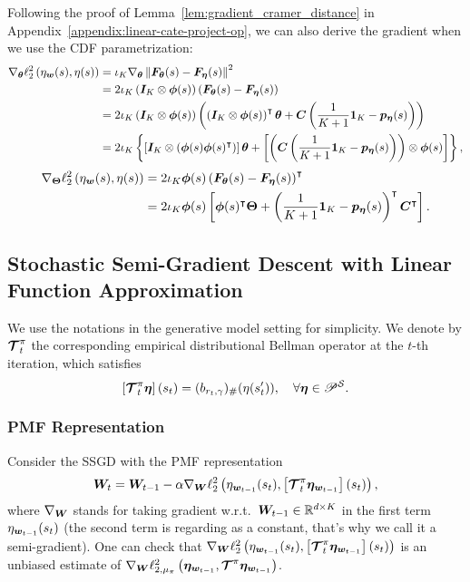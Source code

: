Following the proof of Lemma~\ref{lem:gradient_cramer_distance} in Appendix~\ref{appendix:linear-cate-project-op}, we can also derive the gradient when we use the CDF parametrization:
\begin{align*}
        \nabla_{{\bm{\theta}}} \ell_2^2\left({{\eta}_{{\bm{w}}}(s),{\eta}(s)}\right)&=\iota_K\nabla_{{\bm{\theta}}}\left\|{{\bm{F}}_{{\bm{\theta}}}(s)-{\bm{F}}_{\bm{\eta}}(s)}\right\|^2\\
        &=2\iota_K\left({{\bm{I}}_K\otimes{\bm{\phi}}(s)}\right)\left({{\bm{F}}_{{\bm{\theta}}}(s)-{\bm{F}}_{\bm{\eta}}(s)}\right)\\
        &=2\iota_K\left({{\bm{I}}_K\otimes{\bm{\phi}}(s)}\right)\left({\left({{\bm{I}}_K\otimes{\bm{\phi}}(s)}\right)^{\intercal}{\bm{\theta}}+{\bm{C}}\left({\frac{1}{K+1}\bm{1}_{K}-{\bm{p}}_{\bm{\eta}}(s)}\right)}\right)\\
        &=2\iota_K \left\{{ \left[{{\bm{I}}_K\otimes\left({{\bm{\phi}}(s){\bm{\phi}}(s)^{\intercal}}\right)}\right]{\bm{\theta}}+  
 \left[{\left({{\bm{C}}\left({\frac{1}{K+1}\bm{1}_{K}-{\bm{p}}_{\bm{\eta}}(s)}\right)}\right)\otimes {\bm{\phi}}(s)}\right]}\right\},
    \end{align*}
\begin{equation}\label{eq:gradient_cdf_representation}
            \begin{aligned}
        \nabla_{{\bm{\Theta}}} \ell_2^2\left({{\eta}_{{\bm{w}}}(s),{\eta}(s)}\right)&=2\iota_K{\bm{\phi}}(s)\left({{\bm{F}}_{{\bm{\theta}}}(s)-{\bm{F}}_{\bm{\eta}}(s)}\right)^{\intercal}\\
        &=2\iota_K{\bm{\phi}}(s)\left[{{\bm{\phi}}(s)^{\intercal}{\bm{\Theta}}+\left({\frac{1}{K+1}\bm{1}_{K}-{\bm{p}}_{\bm{\eta}}(s)}\right)^{\intercal}{\bm{C}}^{\intercal}}\right].
    \end{aligned}
    \end{equation}

\subsection{Stochastic Semi-Gradient Descent with Linear Function Approximation}\label{appendix:equiv_ssgd_lctd}
We use the notations in the generative model setting for simplicity.
We denote by ${\bm{\mathcal{T}}}_t^\pi$ the corresponding empirical distributional Bellman operator at the $t$-th iteration, which satisfies
\begin{equation}\label{eq:empirical_op}
    \left[{\bm{\mathcal{T}}_t^\pi{\bm{\eta}}}\right](s_{t})=(b_{r_{t},\gamma})_\#(\eta(s_{t}^\prime)),\quad\forall\bm{\eta}\in{\mathscr{P}}^{{\mathcal{S}}}.
\end{equation}
\subsubsection{PMF Representation}
Consider the SSGD with the PMF representation
\[
    {\bm{W}}_t={\bm{W}}_{t-1}-\alpha\nabla_{{\bm{W}}}\ell_2^2\left({{\eta}_{{\bm{w}}_{t-1}}(s_t), \left[{\bm{\mathcal{T}}_t^\pi{\bm{\eta}_{{\bm{w}}_{t-1}}}}\right](s_{t})}\right),
\]
where $\nabla_{{\bm{W}}}$ stands for taking gradient w.r.t.\ ${\bm{W}}_{t-1} \in {\mathbb R}^{d\times K}$ in the first term ${\eta}_{{\bm{w}}_{t-1}}(s_t)$ (the second term is regarding as a constant, that's why we call it a semi-gradient). 
One can check that $\nabla_{{\bm{W}}}\ell_2^2\left({{\eta}_{{\bm{w}}_{t-1}}(s_t), \left[{\bm{\mathcal{T}}_t^\pi{\bm{\eta}_{{\bm{w}}_{t-1}}}}\right](s_{t})}\right)$ is an unbiased estimate of $\nabla_{{\bm{W}}} \ell_{2,\mu_{\pi}}^2\left({\bm{\eta}_{{\bm{w}}_{t-1}},\bm{\mathcal{T}}^\pi{\bm{\eta}_{{\bm{w}}_{t-1}}}}\right)$.

